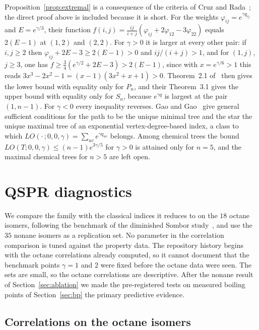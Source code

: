\documentclass[a5paper, 10pt]{article}
\theoremstyle{plain}
\theoremstyle{remark}
\theoremstyle{definition}
\begin{document}
Proposition~\ref{prop:extremal} is a consequence of the criteria of Cruz and Rada~\cite{CruzRada2019PathStar}; the direct proof above is included because it is short. For the weights $\varphi_{ij} = e^{\gamma q_{ij}}$ and $E = e^{\gamma/3}$, their function $f(i,j) = \tfrac{ij}{i+j}(\varphi_{ij} + 2\varphi_{12} - 3\varphi_{22})$ equals $2(E - 1)$ at $(1,2)$ and $(2,2)$. For $\gamma > 0$ it is larger at every other pair: if $i, j \ge 2$ then $\varphi_{ij} + 2E - 3 \ge 2(E-1) > 0$ and $ij/(i+j) > 1$, and for $(1,j)$, $j \ge 3$, one has $f \ge \tfrac34(e^{\gamma/2} + 2E - 3) > 2(E-1)$, since with $x = e^{\gamma/6} > 1$ this reads $3x^3 - 2x^2 - 1 = (x-1)(3x^2 + x + 1) > 0$. Theorem~2.1 of~\cite{CruzRada2019PathStar} then gives the lower bound with equality only for $P_n$, and their Theorem~3.1 gives the upper bound with equality only for $S_n$, because $e^{\gamma q}$ is largest at the pair $(1,n-1)$. For $\gamma < 0$ every inequality reverses. Gao and Gao~\cite{GaoAMC2024} give general sufficient conditions for the path to be the unique minimal tree and the star the unique maximal tree of an exponential vertex-degree-based index, a class to which $LO(\cdot\,;0,0,\gamma) = \sum_{uv} e^{\gamma q_{uv}}$ belongs. Among chemical trees the bound
$LO(T;0,0,\gamma) \le (n-1)e^{3\gamma/5}$ for $\gamma > 0$ is attained only
for $n = 5$, and the maximal chemical trees for $n > 5$ are left open.

\section{QSPR diagnostics}\label{sec:sensitivity}

We compare the family with the classical indices it reduces to on the
$18$ octane isomers, following the benchmark of the diminished Sombor
study~\cite{MovahediGutmanRedzepovicFurtula2026}, and use the $35$ nonane
isomers as a replication set. No parameter in the correlation comparison
is tuned against the property data. The repository history begins with the octane correlations already
computed, so it cannot document that the benchmark points $\gamma = 1$ and
$2$ were fixed before the octane data were seen. The sets are small, so the octane
correlations are descriptive. After the nonane result of
Section~\ref{sec:ablation} we made the pre-registered tests on measured
boiling points of Section~\ref{sec:bp} the primary predictive evidence.

\subsection{Correlations on the octane isomers}\label{sec:octanes}
\end{document}
